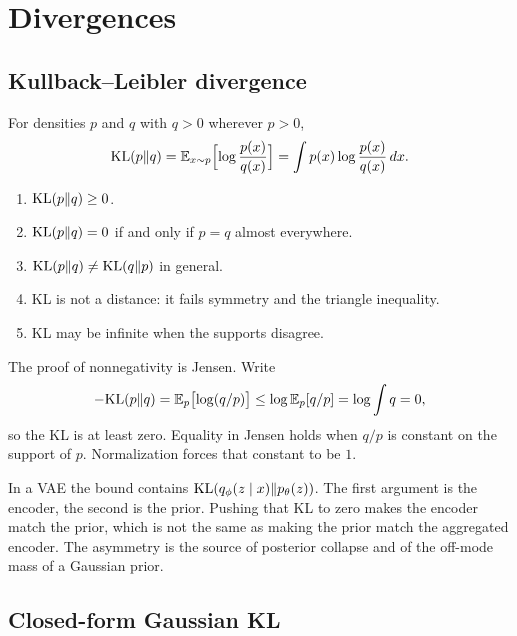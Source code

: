 \chapter{Divergences}
\label{ch:info}

\section{Kullback--Leibler divergence}

\begin{defbox}
For densities $p$ and $q$ with $q>0$ wherever $p>0$,
\[
\mathrm{KL}(p\Vert q)=\mathbb{E}_{x\sim p}\Bigl[\log\frac{p(x)}{q(x)}\Bigr]
=\int p(x)\log\frac{p(x)}{q(x)}\,dx.
\]
\end{defbox}

\begin{resultbox}
\begin{enumerate}[label=\arabic*.]
\item $\mathrm{KL}(p\Vert q)\ge 0$.
\item $\mathrm{KL}(p\Vert q)=0$ if and only if $p=q$ almost everywhere.
\item $\mathrm{KL}(p\Vert q)\neq \mathrm{KL}(q\Vert p)$ in general.
\item KL is not a distance: it fails symmetry and the triangle inequality.
\item KL may be infinite when the supports disagree.
\end{enumerate}
\end{resultbox}

The proof of nonnegativity is Jensen. Write
\[
-\mathrm{KL}(p\Vert q)=\mathbb{E}_p\bigl[\log(q/p)\bigr]\le \log \mathbb{E}_p[q/p]=\log\int q=0,
\]
so the KL is at least zero. Equality in Jensen holds when $q/p$ is constant on the support of $p$. Normalization forces that constant to be $1$.

\begin{pitbox}
In a VAE the bound contains $\mathrm{KL}(q_\phi(z\mid x)\Vert p_\theta(z))$. The first argument is the encoder, the second is the prior. Pushing that KL to zero makes the encoder match the prior, which is not the same as making the prior match the aggregated encoder. The asymmetry is the source of posterior collapse and of the off-mode mass of a Gaussian prior.
\end{pitbox}

\section{Closed-form Gaussian KL}

